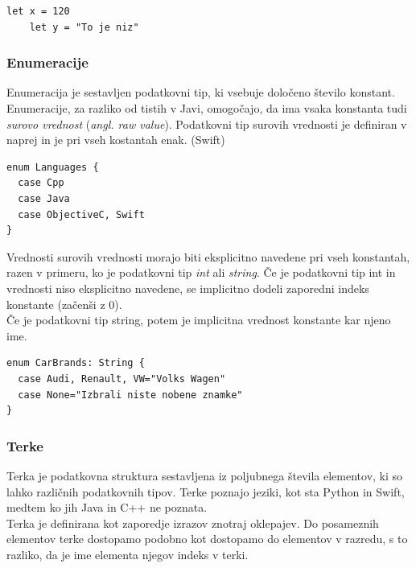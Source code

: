 \documentclass[a4paper, 12pt]{book}
\begin{document}
\begin{lstlisting}[caption={Primer deklaracij spremenljivk, kjer je njun tip prepoznan avtomastsko}, captionpos=b]
	let x = 120
	let y = "To je niz"
\end{lstlisting}

\subsubsection{Enumeracije}

Enumeracija je sestavljen podatkovni tip, ki vsebuje določeno število konstant. Enumeracije, za razliko od tistih v Javi, omogočajo, da ima vsaka konstanta tudi \textit{surovo vrednost} (\textit{angl. raw value}). Podatkovni tip surovih vrednosti je definiran v naprej in je pri vseh kostantah enak. (Swift)

\begin{lstlisting}[caption=Enumeracija brez surovih vrednosti, captionpos=b, label={lst:languagesEnumeration}]
enum Languages {
  case Cpp
  case Java
  case ObjectiveC, Swift
}
\end{lstlisting}

\indent Vrednosti surovih vrednosti morajo biti eksplicitno navedene pri vseh konstantah, razen v primeru, ko je podatkovni tip \textit{int} ali \textit{string}. Če je podatkovni tip int in vrednosti niso eksplicitno navedene, se implicitno dodeli zaporedni indeks konstante (začenši z 0).\\
\indent Če je podatkovni tip string, potem je implicitna vrednost konstante kar njeno ime.
 
\begin{lstlisting}[caption=Enumeracija s surovimi vrednostmi tipa String, captionpos=b]
enum CarBrands: String {
  case Audi, Renault, VW="Volks Wagen"
  case None="Izbrali niste nobene znamke"
}
\end{lstlisting}

 
 \subsubsection{Terke}
 
Terka je podatkovna struktura sestavljena iz poljubnega števila elementov, ki so lahko različnih podatkovnih tipov. Terke poznajo jeziki, kot sta Python in Swift, medtem ko jih Java in C++ ne poznata.\\
\indent Terka je definirana kot zaporedje izrazov znotraj oklepajev. Do posameznih elementov terke dostopamo podobno kot dostopamo do elementov v razredu, s to razliko, da je ime elementa njegov indeks v terki. 
\end{document}
